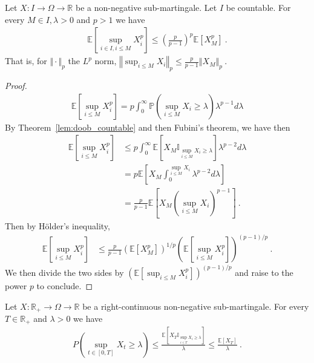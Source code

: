 \begin{lemma}\label{lem:doob_Lp_countable}
  Let $X : I \rightarrow \Omega \rightarrow \mathbb{R}$ be a non-negative sub-martingale. Let $I$ be countable.
  For every $M\in I,\lambda > 0$ and $p>1$ we have
  \begin{align*}
    \mathbb{E}\left[ \sup_{i\in I, i \leq M}X_i^p \right]
    \leq \left(\frac{p}{p-1}\right)^p\mathbb{E}[X_M^p]
    \: .
  \end{align*}
  That is, for $\Vert \cdot \Vert_p$ the $L^p$ norm,
  $\left\Vert \sup_{i \le M}  X_i  \right\Vert_p
    \leq \frac{p}{p-1} \left\Vert X_M \right\Vert_p
    \: .$
\end{lemma}

\begin{proof}
\begin{align*}
  \mathbb{E}\left[ \sup_{i \le M}X_i^p \right]
  = p \int_0^\infty \mathbb{P}\left( \sup_{i \le M}X_i \geq \lambda \right) \lambda^{p-1} d\lambda
\end{align*}
By Theorem~\ref{lem:doob_countable} and then Fubini's theorem, we have then
\begin{align*}
  \mathbb{E}\left[ \sup_{i \le M}X_i^p \right]
  &\le p \int_0^\infty \mathbb{E}\left[X_M \mathbb{I}_{\sup_{i \le M}X_i \ge \lambda}\right] \lambda^{p-2} d\lambda
  \\
  &= p \mathbb{E}\left[X_M \int_0^{\sup_{i \le M}X_i} \lambda^{p-2} d\lambda\right]
  \\
  &= \frac{p}{p - 1} \mathbb{E}\left[X_M (\sup_{i \le M}X_i)^{p-1}\right]
  \: .
\end{align*}
Then by Hölder's inequality,
\begin{align*}
  \mathbb{E}\left[ \sup_{i \le M}X_i^p \right]
  &\le \frac{p}{p - 1} \left(\mathbb{E}[X_M^p]\right)^{1/p} \left(\mathbb{E}\left[\sup_{i \le M}X_i^p \right]\right)^{(p-1)/p}
  \: .
\end{align*}
We then divide the two sides by $\left(\mathbb{E}\left[\sup_{i \le M}X_i^p \right]\right)^{(p-1)/p}$ and raise to the power $p$ to conclude.
\end{proof}


\begin{theorem}\label{thm:doob_ineq}
  \leanok
  Let $X: \mathbb{R}_+ \to \Omega \to \mathbb{R}$ be a right-continuous non-negative sub-martingale.
  For every $T \in \mathbb{R}_+$ and $\lambda>0$ we have
  \begin{align*}
    P\left( \sup_{t\in[0,T]}X_t \geq \lambda \right)
    \leq \frac{\mathbb{E}[X_T \mathbb{I}_{\sup_{i \le T}X_i \ge \lambda}]}{\lambda}
    \leq \frac{\mathbb{E}[X_T]}{\lambda}
    \: .
  \end{align*}
\end{theorem}

